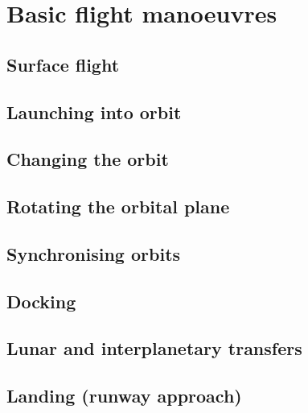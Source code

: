 \documentclass[Orbiter User Manual.tex]{subfiles}
\begin{document}
\section{Basic flight manoeuvres}

\subsection{Surface flight}

\subsection{Launching into orbit}

\subsection{Changing the orbit}

\subsection{Rotating the orbital plane}

\subsection{Synchronising orbits}

\subsection{Docking}

\subsection{Lunar and interplanetary transfers}

\subsection{Landing (runway approach)}
\end{document}
